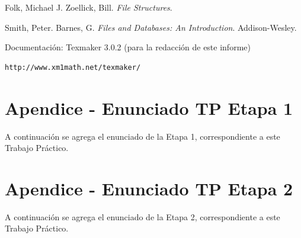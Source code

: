 \documentclass[a4paper,10pt]{article}
\begin{document}
\newpage


\begin{thebibliography}{01}
 Folk, Michael J. Zoellick, Bill. \textit{File Structures}.

 Smith, Peter. Barnes, G. \textit{Files and Databases: An Introduction}. Addison-Wesley.

 Documentación: Texmaker 3.0.2 (para la redacción de este informe) \begin{verbatim}
http://www.xm1math.net/texmaker/
\end{verbatim}


\end{thebibliography}
\newpage


\section{Apendice - Enunciado TP Etapa 1}
A continuación se agrega el enunciado de la Etapa 1, correspondiente a este Trabajo Práctico.


\section{Apendice - Enunciado TP Etapa 2}
A continuación se agrega el enunciado de la Etapa 2, correspondiente a este Trabajo Práctico.

\end{document}
